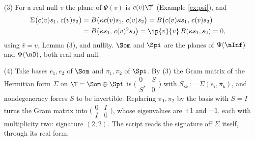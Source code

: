 (3) For a real null $v$ the plane of $\Psi(v)$ is $c(v)\T'$ (Example \ref{ex:psi}), and
\begin{align*}
\Sigma\bigl(c(v)s_1,\, c(v)s_2\bigr) &= B\bigl(\kappa c(v)s_1,\, c(v)s_2\bigr) = B\bigl(c(v)\kappa s_1,\, c(v)s_2\bigr)\\
&= B\bigl(\kappa s_1,\, c(v)^2 s_2\bigr) = \ip{v}{v}\,B(\kappa s_1, s_2) = 0 ,
\end{align*}
using $\bar v = v$, Lemma (3), and nullity. $\Som$ and $\Spi$ are the planes of $\Psi(\nInf)$ and $\Psi(\nO)$, both real and null.

(4) Take bases $e_1, e_2$ of $\Som$ and $\pi_1, \pi_2$ of $\Spi$. By (3) the Gram matrix of the Hermitian form $\Sigma$ on $\T = \Som\oplus\Spi$ is $\bigl(\begin{smallmatrix} 0 & S \\ S^* & 0\end{smallmatrix}\bigr)$ with $S_{ik} := \Sigma(e_i, \pi_k)$, and nondegeneracy forces $S$ to be invertible. Replacing $\pi_1, \pi_2$ by the basis with $S = I$ turns the Gram matrix into $\bigl(\begin{smallmatrix} 0 & I \\ I & 0\end{smallmatrix}\bigr)$, whose eigenvalues are $+1$ and $-1$, each with multiplicity two: signature $(2,2)$. The script reads the signature off $\Sigma$ itself, through its real form.

